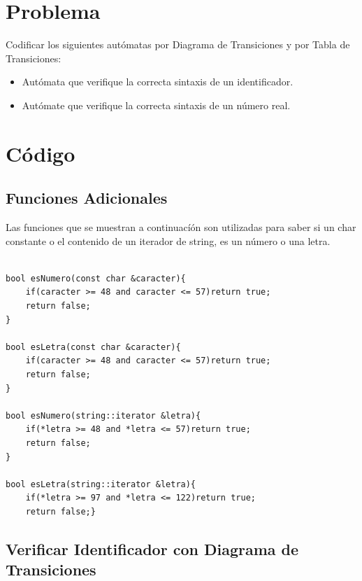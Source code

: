\documentclass[a4paper,12pt]{article}
\begin{document}
\section{Problema}

Codificar los siguientes autómatas por Diagrama de Transiciones y por Tabla de Transiciones:

\begin{itemize}

\item Autómata que verifique la correcta sintaxis de un identificador.
\item Autómate que verifique la correcta sintaxis de un número real.

\end{itemize}

\section{Código} 

\subsection{Funciones Adicionales}

Las funciones que se muestran a continuacíón son utilizadas para saber si un char constante o el contenido de un iterador de string, es un número o una letra.

\begin{lstlisting}

bool esNumero(const char &caracter){
    if(caracter >= 48 and caracter <= 57)return true;
    return false;
}

bool esLetra(const char &caracter){
    if(caracter >= 48 and caracter <= 57)return true;
    return false;
}

bool esNumero(string::iterator &letra){
    if(*letra >= 48 and *letra <= 57)return true;
    return false;
}

bool esLetra(string::iterator &letra){
    if(*letra >= 97 and *letra <= 122)return true;
    return false;}

\end{lstlisting}

\subsection{Verificar Identificador con Diagrama de Transiciones}
\end{document}

